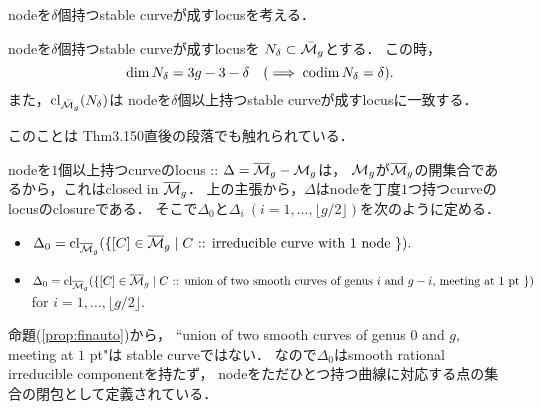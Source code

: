 \documentclass[a4paper]{jsarticle}
\begin{document}
\section{}

    nodeを$\delta$個持つstable curveが成すlocusを考える．
    \begin{Claim}
        nodeを$\delta$個持つstable curveが成すlocusを
        $N_{\delta} \subset \bar{\mathcal{M}}_g$とする．
        この時，
        \[ \dim N_{\delta}=3g-3-\delta \quad (\implies \operatorname{codim} N_{\delta}=\delta). \]
        また，$\operatorname{cl}_{\bar{\mathcal{M}}_g}(N_{\delta})$は
        nodeを$\delta$個以上持つstable curveが成すlocusに一致する．
    \end{Claim}
    このことは\cite{HaMo} Thm3.150直後の段落でも触れられている．

    nodeを$1$個以上持つcurveのlocus :: $\Delta=\overline{\mathcal{M}}_g-\mathcal{M}_g$は，
    $\mathcal{M}_g$が$\overline{\mathcal{M}}_g$の開集合であるから，これはclosed in $\overline{\mathcal{M}}_g$．
    上の主張から，$\Delta$はnodeを丁度$1$つ持つcurveのlocusのclosureである．
    そこで$\Delta_0$と$\Delta_i \ (i=1,\dots,\lfloor g/2\rfloor)$を次のように定める．
    \begin{itemize}
        \item $\Delta_0=\operatorname{cl}_{\overline{\mathcal{M}}_g}(\{ [C] \in \overline{\mathcal{M}}_g \mid
                C \text{ :: irreducible curve with $1$ node } \}).$
        \item $\Delta_0=\operatorname{cl}_{\overline{\mathcal{M}}_g}(\{ [C] \in \overline{\mathcal{M}}_g \mid
                C \text{ :: union of two smooth curves of genus $i$ and $g-i$, meeting at $1$ pt } \})$
                for $i=1,\dots,\lfloor g/2\rfloor.$
    \end{itemize}
    \begin{Remark}
        命題(\ref{prop:finauto})から，
        ``union of two smooth curves of genus $0$ and $g$, meeting at $1$ pt"は
        stable curveではない．
        なので$\Delta_0$はsmooth rational irreducible componentを持たず，
        nodeをただひとつ持つ曲線に対応する点の集合の閉包として定義されている．
    \end{Remark}
\end{document}
